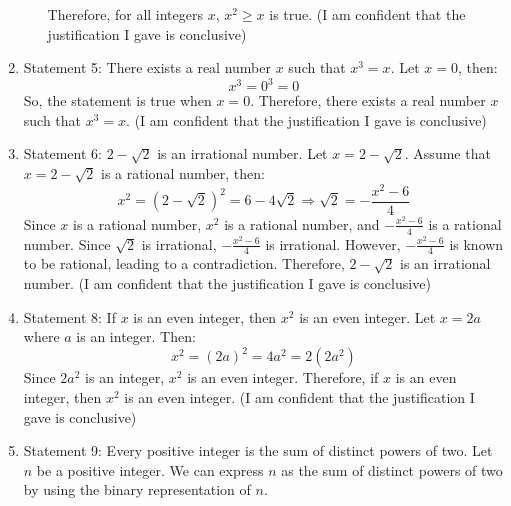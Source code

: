 \documentclass{article}
\begin{document}
\begin{enumerate}
\begin{itemize}
                    Therefore, for all integers \(x\), \(x^2 \geq x\) is true.\newline
                    (I am confident that the justification I gave is conclusive)
          \end{itemize}
    \item Statement 5: There exists a real number $x$ such that $x^3 = x$.\newline
          Let \(x = 0\), then:
          \[
              x^3 = 0^3 = 0
          \]
          So, the statement is true when \(x = 0\).\newline
          Therefore, there exists a real number \(x\) such that \(x^3 = x\).\newline
          (I am confident that the justification I gave is conclusive)
    \item Statement 6: $2 - \sqrt{2}$ is an irrational number.\newline
          Let \(x = 2 - \sqrt{2}\). Assume that \(x = 2 - \sqrt{2}\) is a rational number, then:
          \[
              x^2 = {{(2 - \sqrt{2})}^2} = 6 - 4\sqrt{2} \Rightarrow \sqrt{2} = -\frac{x^2-6}{4}
          \]
          Since \(x\) is a rational number, \(x^2\) is a rational number, and \(-\frac{x^2-6}{4}\) is a rational number.\newline
          Since \(\sqrt{2}\) is irrational, \(-\frac{x^2-6}{4}\) is irrational. However, \(-\frac{x^2-6}{4}\) is known to be rational,
          leading to a contradiction.\newline
          Therefore, \(2 - \sqrt{2}\) is an irrational number.\newline
          (I am confident that the justification I gave is conclusive)
    \item Statement 8: If $x$ is an even integer, then $x^2$ is an even integer.\newline
          Let \(x = 2a\) where \(a\) is an integer. Then:
          \[
              x^2 = (2a)^2 = 4a^2 = 2(2a^2)
          \]
          Since \(2a^2\) is an integer, \(x^2\) is an even integer.\newline
          Therefore, if \(x\) is an even integer, then \(x^2\) is an even integer.\newline
          (I am confident that the justification I gave is conclusive)
    \item Statement 9: Every positive integer is the sum of distinct powers of two.\newline
          Let \(n\) be a positive integer. We can express \(n\) as the sum of distinct powers of two by using the binary representation of \(n\).

\end{enumerate}
\end{document}
